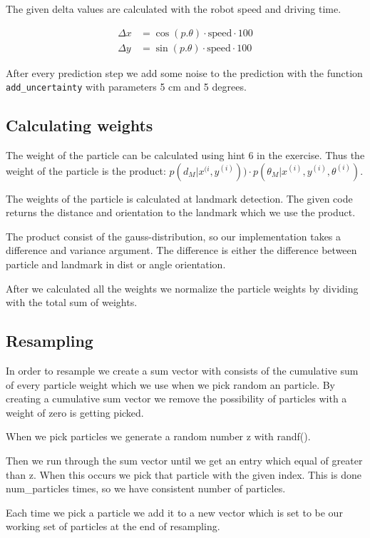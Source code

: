 \documentclass[a4paper,12pt]{article}
\begin{document}
The given delta values are calculated with the robot speed and driving time. 

\begin{align*}
\Delta x &= \cos(p.\theta)\cdot\text{speed}\cdot 100\\
\Delta y &= \sin(p.\theta)\cdot\text{speed}\cdot 100
\end{align*}

After every prediction step we add some noise to the prediction with the
function \texttt{add_uncertainty} with parameters 5 cm and 5 degrees.

\subsection{Calculating weights}

The weight of the particle can be calculated using hint 6 in the exercise. Thus
the weight of the particle is the product: $p(d_M | x^{(i}, y^{(i)})) \cdot
p(\theta_M |x^{(i)} , y^{(i)} , \theta^{(i)} ) $.

The weights of the particle is calculated at landmark detection. The given code
returns the distance and orientation to the landmark which we use the product.

The product consist of the gauss-distribution, so our implementation takes a
difference and variance argument. The difference is either the difference
between particle and landmark in dist or angle orientation.

After we calculated all the weights we normalize the particle weights by
dividing with the total sum of weights.

\subsection{Resampling}

In order to resample we create a sum vector with consists of the cumulative sum
of every particle weight which we use when we pick random an particle. By
creating a cumulative sum vector we remove the possibility of particles with a
weight of zero is getting picked.

When we pick particles we generate a random number z with randf().

Then we run through the sum vector until we get an entry which equal of greater
than z. When this occurs we pick that particle with the given index. This is
done num_particles times, so we have consistent number of particles.

Each time we pick a particle we add it to a new vector which is set to be our
working set of particles at the end of resampling.
\end{document}
